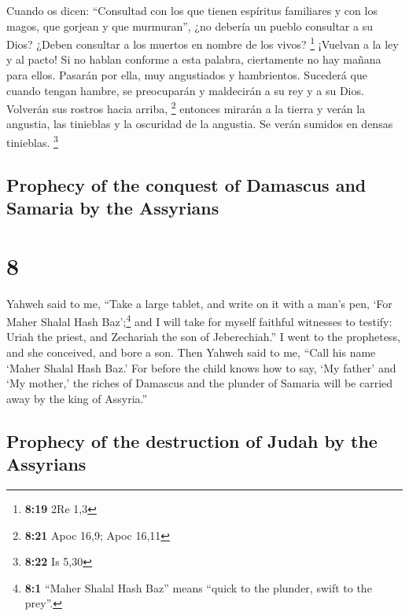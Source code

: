 \begin{paracol}{2}
 Cuando os dicen: ``Consultad con los que tienen
espíritus familiares y con los magos, que gorjean y que murmuran'', ¿no
debería un pueblo consultar a su Dios? ¿Deben consultar a los muertos en
nombre de los vivos? \footnote{\textbf{8:19} 2Re 1,3} 
¡Vuelvan a la ley y al pacto! Si no hablan conforme a esta palabra,
ciertamente no hay mañana para ellos.  Pasarán por ella,
muy angustiados y hambrientos. Sucederá que cuando tengan hambre, se
preocuparán y maldecirán a su rey y a su Dios. Volverán sus rostros
hacia arriba, \footnote{\textbf{8:21} Apoc 16,9; Apoc 16,11}
 entonces mirarán a la tierra y verán la angustia, las
tinieblas y la oscuridad de la angustia. Se verán sumidos en densas
tinieblas. \footnote{\textbf{8:22} Is 5,30}

\switchcolumn
\begin{otherlanguage}{english}

\hypertarget{prophecy-of-the-conquest-of-damascus-and-samaria-by-the-assyrians}{%
\subsection{Prophecy of the conquest of Damascus and Samaria by the
Assyrians}\label{prophecy-of-the-conquest-of-damascus-and-samaria-by-the-assyrians}}

\hypertarget{section-15}{%
\section{8}\label{section-15}}

 Yahweh said to me, ``Take a large tablet, and write on it
with a man's pen, `For Maher Shalal Hash Baz';\footnote{\textbf{8:1}
  ``Maher Shalal Hash Baz'' means ``quick to the plunder, swift to the
  prey''.}  and I will take for myself faithful witnesses
to testify: Uriah the priest, and Zechariah the son of Jeberechiah.''
 I went to the prophetess, and she conceived, and bore a
son. Then Yahweh said to me, ``Call his name `Maher Shalal Hash Baz.'
 For before the child knows how to say, `My father' and
`My mother,' the riches of Damascus and the plunder of Samaria will be
carried away by the king of Assyria.''

\hypertarget{prophecy-of-the-destruction-of-judah-by-the-assyrians}{%
\subsection{Prophecy of the destruction of Judah by the
Assyrians}\label{prophecy-of-the-destruction-of-judah-by-the-assyrians}}


\end{otherlanguage}
\end{paracol}
